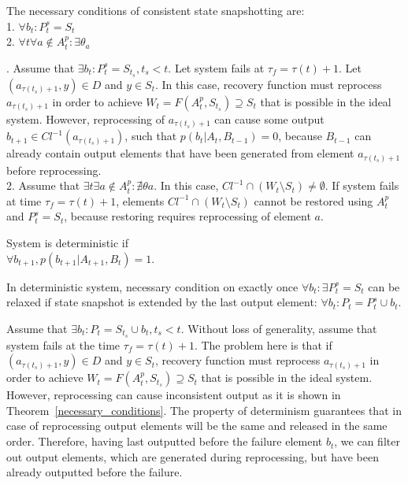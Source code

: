 \begin{theorem}
\label{necessary_conditions}
The necessary conditions of consistent state snapshotting are:\\
1. $\forall{b_t}:P^{s}_t=S_t$\\
2. $\forall{t}\forall{a}\notin{A^{p}_t} : \exists{\theta_a}$
\end{theorem}
\begin{sketch}
$ $. Assume that $\exists{b_t}:P^{s}_t = S_{t_s}, t_s < t$. Let system fails at $\tau_f = \tau(t)+1$. Let $(a_{\tau(t_s)+1},y)\in{D}$ and $y\in{S_t}$. In this case, recovery function must reprocess $a_{\tau(t_s)+1}$ in order to achieve $W_t=F(A^{p}_t,S_{t_s})\supseteq{S_t}$ that is possible in the ideal system. However, reprocessing of $a_{\tau(t_s)+1}$ can cause some output $ b_{t+1}\in{Cl^{-1}(a_{\tau(t_s)+1})}$, such that $p(b_{t}|A_t,B_{t-1})=0$, because $B_{t-1}$ can already contain output elements that have been generated from element $a_{\tau(t_s)+1}$ before reprocessing. \\
2. Assume that $\exists{t} \exists{a} \notin{A^{p}_t}:\nexists{\theta{a}}$. In this case, $Cl^{-1} \cap (W_t \setminus{S_t}) \neq \emptyset$. If system fails at time $\tau_f=\tau(t)+1$, elements $Cl^{-1} \cap (W_t \setminus{S_t})$ cannot be restored using $A^{p}_t$ and $P^{s}_t=S_t$, because restoring requires reprocessing of element $a$.
\end{sketch}

\begin{definition}{System is deterministic}
if\\ 
$\forall{b_{t+1}},p(b_{t+1}|A_{t+1},B_t)=1$.
\end{definition}

\begin{theorem}
\label{determinism}
In deterministic system, necessary condition on exactly once $\forall{b_t} : \exists{P^{s}_t=S_t}$ can be relaxed if state snapshot is extended by the last output element: $\forall{b_t}:P_t=P^{s}_t \cup b_t$.
\end{theorem}
\begin{sketch}
Assume that $\exists{b_t}:P_t = S_{t_s} \cup b_t, t_s < t$. Without loss of generality, assume that system fails at the time $\tau_f = \tau(t)+1$. The problem here is that if $(a_{\tau(t_s)+1},y)\in{D}$ and $y\in{S_t}$, recovery function must reprocess $a_{\tau(t_s)+1}$ in order to achieve $W_t=F(A^{p}_t,S_{t_s})\supseteq{S_t}$ that is possible in the ideal system. However, reprocessing can cause inconsistent output as it is shown in Theorem~\ref{necessary_conditions}. The property of determinism guarantees that in case of reprocessing output elements will be the same and released in the same order. Therefore, having last outputted before the failure element $b_t$, we can filter out output elements, which are generated during reprocessing, but have been already outputted before the failure.
\end{sketch}

